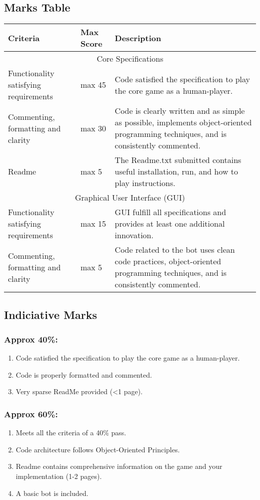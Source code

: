 \documentclass{article}
\begin{document}
{\subsection{Marks  Table}
\begin{center}
    \begin{tabular}{ | l | l	 | p{5cm} |}
    \hline
    Criteria & Max Score & Description \\ \hline
      \multicolumn{3}{|c|}{Core Specifications} \\ \hline
    Functionality satisfying requirements & max 45 & Code satisfied the specification to play the core game as a human-player. \\ \hline
    Commenting, formatting and clarity & max 30 & Code is clearly written and as simple as possible, implements object-oriented programming techniques, and is consistently commented. \\ \hline
    Readme & max 5 & The Readme.txt submitted contains useful installation, run, and how to play instructions. \\ \hline
  \multicolumn{3}{|c|}{Graphical User Interface (GUI)} \\ \hline
        Functionality satisfying requirements & max 15 & GUI fulfill all specifications and provides at least one additional innovation. \\ \hline
    Commenting, formatting and clarity & max 5 & Code related to the bot uses clean code practices, object-oriented programming techniques, and is consistently commented. \\ \hline
    \end{tabular}
\end{center}

\subsection{Indiciative Marks}
\subsubsection{Approx 40\%:}
\begin{enumerate}
\item Code satisfied the specification to play the core game as a human-player.
\item Code is properly formatted and commented.
\item Very sparse ReadMe provided (<1 page).
\end{enumerate}
\subsubsection{Approx 60\%:}
\begin{enumerate}
\item Meets all the criteria of a 40\% pass.
\item Code architecture follows Object-Oriented Principles.
\item Readme contains comprehensive information on the game and your implementation (1-2 pages).
\item A basic bot is included.
\end{enumerate}
}
\end{document}
